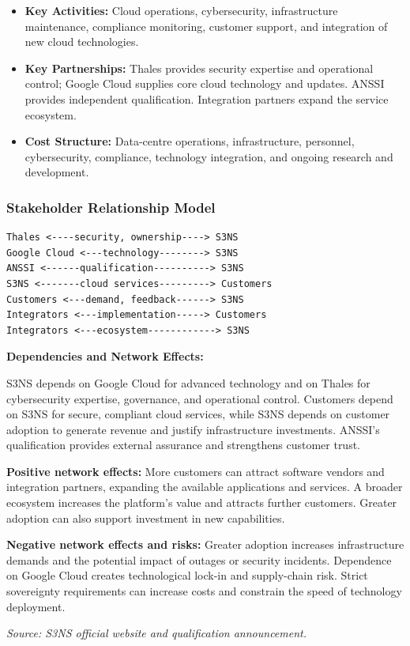 \begin{itemize}
    \item \textbf{Key Activities:} Cloud operations, cybersecurity, infrastructure maintenance, compliance monitoring, customer support, and integration of new cloud technologies.

    \item \textbf{Key Partnerships:} Thales provides security expertise and operational control; Google Cloud supplies core cloud technology and updates. ANSSI provides independent qualification. Integration partners expand the service ecosystem.

    \item \textbf{Cost Structure:} Data-centre operations, infrastructure, personnel, cybersecurity, compliance, technology integration, and ongoing research and development.
\end{itemize}

\subsubsection{Stakeholder Relationship Model}

\begin{verbatim}
Thales <----security, ownership----> S3NS
Google Cloud <---technology--------> S3NS
ANSSI <------qualification----------> S3NS
S3NS <-------cloud services---------> Customers
Customers <---demand, feedback------> S3NS
Integrators <---implementation-----> Customers
Integrators <---ecosystem------------> S3NS
\end{verbatim}

\textbf{Dependencies and Network Effects:}

S3NS depends on Google Cloud for advanced technology and on Thales for cybersecurity expertise, governance, and operational control. Customers depend on S3NS for secure, compliant cloud services, while S3NS depends on customer adoption to generate revenue and justify infrastructure investments. ANSSI's qualification provides external assurance and strengthens customer trust.

\textbf{Positive network effects:} More customers can attract software vendors and integration partners, expanding the available applications and services. A broader ecosystem increases the platform's value and attracts further customers. Greater adoption can also support investment in new capabilities.

\textbf{Negative network effects and risks:} Greater adoption increases infrastructure demands and the potential impact of outages or security incidents. Dependence on Google Cloud creates technological lock-in and supply-chain risk. Strict sovereignty requirements can increase costs and constrain the speed of technology deployment.

\noindent\textit{Source: S3NS official website and qualification announcement.}